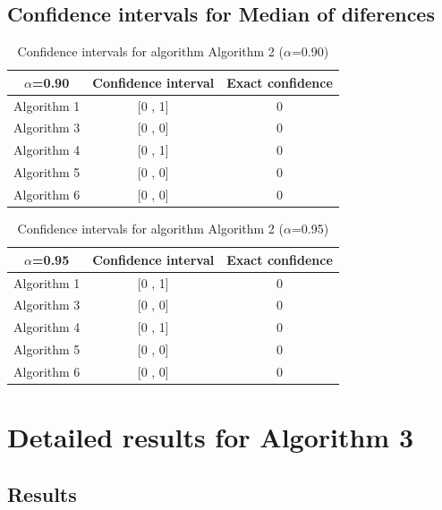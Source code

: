 \documentclass[a4paper,10pt]{article}
\begin{document}
\subsection{Confidence intervals for Median of diferences}

\begin{table}[!htp]
\centering\small
\begin{tabular}{
|c|c|c|}
\hline
 $\alpha$=0.90 & Confidence interval & Exact confidence \\ \hline 
Algorithm 1 & [0 , 1] & 0\\ \hline 
Algorithm 3 & [0 , 0] & 0\\ \hline 
Algorithm 4 & [0 , 1] & 0\\ \hline 
Algorithm 5 & [0 , 0] & 0\\ \hline 
Algorithm 6 & [0 , 0] & 0\\ \hline 

\end{tabular}
\caption{Confidence intervals for algorithm Algorithm 2 ($\alpha$=0.90)}
\end{table}
\begin{table}[!htp]
\centering\small
\begin{tabular}{
|c|c|c|}
\hline
 $\alpha$=0.95 & Confidence interval & Exact confidence \\ \hline 
Algorithm 1 & [0 , 1] & 0\\ \hline 
Algorithm 3 & [0 , 0] & 0\\ \hline 
Algorithm 4 & [0 , 1] & 0\\ \hline 
Algorithm 5 & [0 , 0] & 0\\ \hline 
Algorithm 6 & [0 , 0] & 0\\ \hline 

\end{tabular}
\caption{Confidence intervals for algorithm Algorithm 2 ($\alpha$=0.95)}
\end{table}

 \clearpage 


\section{Detailed results for Algorithm 3}


\subsection{Results}
\end{document}
